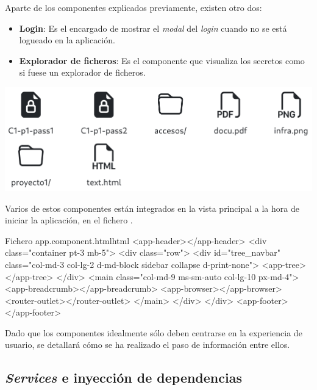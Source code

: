 \documentclass{\ClassPath/viu-tfm-template}
\begin{document}
Aparte de los componentes explicados previamente, existen otro dos:

\begin{itemize}
    \item \textbf{Login}: Es el encargado de mostrar el \textit{modal} del \textit{login} cuando no se está logueado en la aplicación.
    \item \textbf{Explorador de ficheros}: Es el componente que visualiza los secretos como si fuese un explorador de ficheros.
\end{itemize}

\begin{center}
    \includegraphics[width=0.9\linewidth]{img/browser.png}
\end{center}


Varios de estos componentes están integrados en la vista principal a la hora de iniciar la aplicación, en el fichero .

\begin{mycode}{Fichero app.component.html}{html}{}
<app-header></app-header>
<div class="container pt-3 mb-5">
    <div class="row">
        <div id="tree_navbar" class="col-md-3 col-lg-2 d-md-block sidebar
         collapse d-print-none">
            <app-tree></app-tree>
        </div>
        <main class="col-md-9 ms-sm-auto col-lg-10 px-md-4">
            <app-breadcrumb></app-breadcrumb>
            <app-browser></app-browser>
            <router-outlet></router-outlet>
        </main>
    </div>
</div>
<app-footer></app-footer>
\end{mycode}


Dado que los componentes idealmente sólo deben centrarse en la experiencia de usuario, se detallará cómo se ha realizado el paso de información entre ellos.



\subsection{\textit{Services} e inyección de dependencias}
\end{document}
